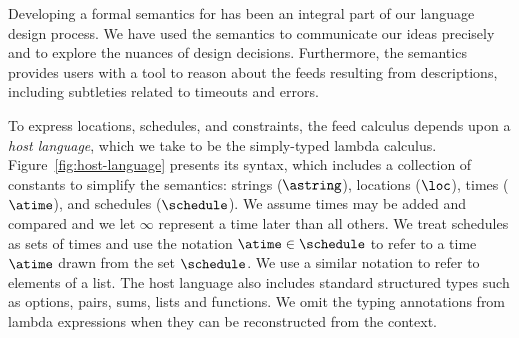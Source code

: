 Developing a formal semantics for \padsd{} has been an
integral part of our language design process.  We have used the semantics to
communicate our ideas precisely and to explore the nuances of design
decisions. Furthermore, the semantics provides users with a tool to reason about the feeds
resulting from \padsd{} descriptions, including subtleties related to
timeouts and errors.

To express locations, schedules, and constraints, the feed calculus
depends upon a {\em host language}, which we take to be the
simply-typed lambda calculus.  Figure~\ref{fig:host-language} presents
its syntax, which includes a collection of constants to simplify the
semantics: strings ($\astring$), locations ($\loc$), times ($\atime$),
and schedules ($\schedule$).  We assume times may be added and
compared and we let $\infty$ represent a time later than all others.
We treat schedules as sets of times and use the notation $\atime
\in \schedule$ to refer to a time $\atime$ drawn from the set
$\schedule$.  We use a similar notation to refer to elements of a
list.  The host language also includes standard structured types such as
options, pairs, sums, lists and functions.
We omit the typing annotations from lambda expressions when they can
be reconstructed from the context.


